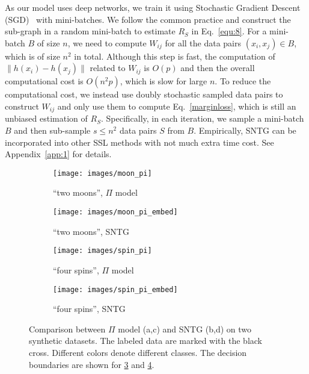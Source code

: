 \documentclass[10pt,twocolumn,letterpaper]{article}
\begin{document}
As our model uses deep networks, we train it using Stochastic Gradient Descent (SGD)~\cite{bottou2010large} with mini-batches.
We follow the common practice and construct the sub-graph in a random mini-batch to estimate $R_S$ in Eq.~\eqref{equ:8}.
For a mini-batch $B$ of size $n$, we need to compute $W_{ij}$ for all the data pairs $(x_i,x_j) \in B$,	which is of size $n^2$ in total. Although this step is fast, the computation of $\|h(x_i) - h(x_j)\|$ related to $W_{ij}$ is $O(p)$ and then the overall computational cost is $O(n^2p)$, which is slow for large $n$. To reduce the computational cost, we instead use doubly stochastic sampled data pairs to construct
$W_{ij}$ and only use them to compute Eq.~\eqref{marginloss}, which is still an unbiased estimation
of $R_S$. Specifically, in each iteration, we sample a mini-batch $B$ and then sub-sample $s \leq n^2$ data pairs $S$ from $B$. Empirically, SNTG can be incorporated into other SSL methods with not much extra time cost.
See Appendix~\ref{app:1} for details.

\begin{figure}[t]\vspace{-0.3cm}
	\centering
	\begin{subfigure}{.234\textwidth}
		\centering
		\texttt{[image: images/moon\_pi]}\vspace{-.2cm}
		\caption{``two moons'', $\Pi$ model}
		\label{fig:moon_pi}\vspace{-.1cm}
	\end{subfigure}
	\begin{subfigure}{.234\textwidth}
		\centering
		\texttt{[image: images/moon\_pi\_embed]}\vspace{-.2cm}
		\caption{``two moons'', SNTG}
		\label{fig:moon_piemb}\vspace{-.1cm}
	\end{subfigure}
	\begin{subfigure}{.234\textwidth}
		\centering
		\texttt{[image: images/spin\_pi]}\vspace{-.2cm}
		\caption{``four spins'', $\Pi$ model}
		\label{fig:spin_pi}
	\end{subfigure}
	\begin{subfigure}{.234\textwidth}
		\centering
		\texttt{[image: images/spin\_pi\_embed]}\vspace{-.2cm}
		\caption{``four spins'', SNTG}
		\label{fig:spin_piemb}
	\end{subfigure}\vspace{-.2cm}
	\caption{Comparison between $\Pi$ model (a,c) and SNTG (b,d) on two synthetic datasets. The labeled data are marked with the black cross. Different colors denote different classes. The decision boundaries are shown for \ref{fig:spin_pi} and \ref{fig:spin_piemb}.}
	\label{fig:synthetic}\vspace{-.2cm}
\end{figure}
\end{document}

